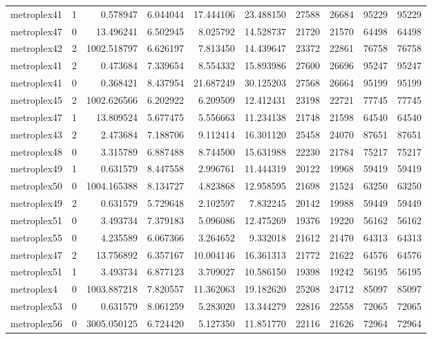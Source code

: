 \begin{longtable}{|l|r|r|r|r|r|r|r|r|r|}
metroplex41 & 1 & 0.578947 & 6.044044 & 17.444106 & 23.488150 & 27588 & 26684 & 95229 & 95229 \\
metroplex47 & 0 & 13.496241 & 6.502945 & 8.025792 & 14.528737 & 21720 & 21570 & 64498 & 64498 \\
metroplex42 & 2 & 1002.518797 & 6.626197 & 7.813450 & 14.439647 & 23372 & 22861 & 76758 & 76758 \\
metroplex41 & 2 & 0.473684 & 7.339654 & 8.554332 & 15.893986 & 27600 & 26696 & 95247 & 95247 \\
metroplex41 & 0 & 0.368421 & 8.437954 & 21.687249 & 30.125203 & 27568 & 26664 & 95199 & 95199 \\
metroplex45 & 2 & 1002.626566 & 6.202922 & 6.209509 & 12.412431 & 23198 & 22721 & 77745 & 77745 \\
metroplex47 & 1 & 13.809524 & 5.677475 & 5.556663 & 11.234138 & 21748 & 21598 & 64540 & 64540 \\
metroplex43 & 2 & 2.473684 & 7.188706 & 9.112414 & 16.301120 & 25458 & 24070 & 87651 & 87651 \\
metroplex48 & 0 & 3.315789 & 6.887488 & 8.744500 & 15.631988 & 22230 & 21784 & 75217 & 75217 \\
metroplex49 & 1 & 0.631579 & 8.447558 & 2.996761 & 11.444319 & 20122 & 19968 & 59419 & 59419 \\
metroplex50 & 0 & 1004.165388 & 8.134727 & 4.823868 & 12.958595 & 21698 & 21524 & 63250 & 63250 \\
metroplex49 & 2 & 0.631579 & 5.729648 & 2.102597 & 7.832245 & 20142 & 19988 & 59449 & 59449 \\
metroplex51 & 0 & 3.493734 & 7.379183 & 5.096086 & 12.475269 & 19376 & 19220 & 56162 & 56162 \\
metroplex55 & 0 & 4.235589 & 6.067366 & 3.264652 & 9.332018 & 21612 & 21470 & 64313 & 64313 \\
metroplex47 & 2 & 13.756892 & 6.357167 & 10.004146 & 16.361313 & 21772 & 21622 & 64576 & 64576 \\
metroplex51 & 1 & 3.493734 & 6.877123 & 3.709027 & 10.586150 & 19398 & 19242 & 56195 & 56195 \\
metroplex4 & 0 & 1003.887218 & 7.820557 & 11.362063 & 19.182620 & 25208 & 24712 & 85097 & 85097 \\
metroplex53 & 0 & 0.631579 & 8.061259 & 5.283020 & 13.344279 & 22816 & 22558 & 72065 & 72065 \\
metroplex56 & 0 & 3005.050125 & 6.724420 & 5.127350 & 11.851770 & 22116 & 21626 & 72964 & 72964 \\

\end{longtable}
